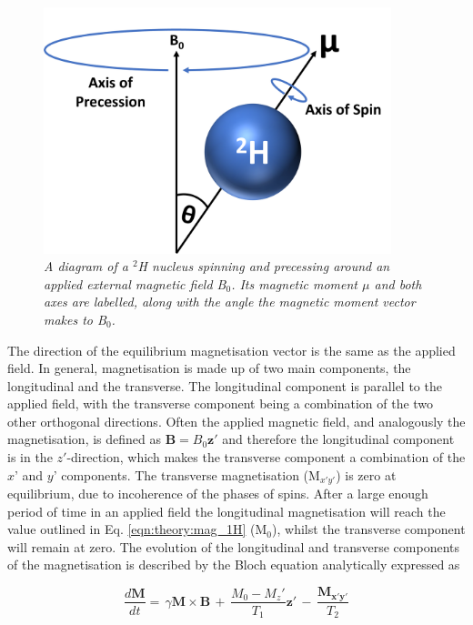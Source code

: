 \begin{figure}
    \centering
    \includegraphics[width=0.9\textwidth]{Figures/Theory/Moment.png}
    \caption{\textit{A diagram of a $^2$H nucleus spinning and precessing around an applied external magnetic field B$_0$. Its magnetic moment $\mu$ and both axes are labelled, along with the angle the magnetic moment vector makes to B$_0$.}}
    \label{fig:theory:moment}
\end{figure}

The direction of the equilibrium magnetisation vector is the same as the applied field. In general, magnetisation is made up of two main components, the longitudinal and the transverse. The longitudinal component is parallel to the applied field, with the transverse component being a combination of the two other orthogonal directions. Often the applied magnetic field, and analogously the magnetisation, is defined as $\mathbf{B}=B_0\mathbf{z'}$ and therefore the longitudinal component is in the $z'$-direction, which makes the transverse component a combination of the $x$' and $y$' components. The transverse magnetisation (M$_{x'y'}$) is zero at equilibrium, due to incoherence of the phases of spins. After a large enough period of time in an applied field the longitudinal magnetisation will reach the value outlined in Eq. \ref{eqn:theory:mag_1H} (M$_0$), whilst the transverse component will remain at zero. The evolution of the longitudinal and transverse components of the magnetisation is described by the Bloch equation \cite{Bloch1946NuclearInduction} analytically expressed as

\begin{equation}
    \frac{d\mathbf{M}}{dt} = \, \gamma\mathbf{M} \times \mathbf{B} \, + \, \frac{M_0-M_z'}{T_1}\mathbf{z'} \, - \, \frac{\mathbf{M_{x'y'}}}{T_2}
    \label{eqn:theory:Bloch}
\end{equation}

